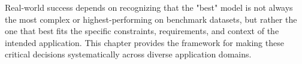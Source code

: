 Real-world success depends on recognizing that the "best" model is not always the most complex or highest-performing on benchmark datasets, but rather the one that best fits the specific constraints, requirements, and context of the intended application. This chapter provides the framework for making these critical decisions systematically across diverse application domains.








% 





